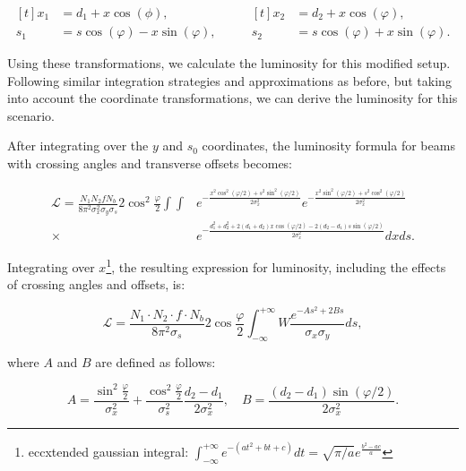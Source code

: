 \begin{equation}
\begin{aligned}[t]
x_1 &= d_1 + x \cos(\phi),  \\
s_1 &= s \cos(\varphi) - x \sin(\varphi),
\end{aligned}
\qquad
\begin{aligned}[t]
       x_2 &= d_2 + x \cos(\varphi), \\
        s_2 &= s \cos(\varphi) + x \sin(\varphi).
\end{aligned}
\end{equation}

Using these transformations, we calculate the luminosity for this modified setup. Following similar integration strategies and approximations as before, but taking into account the coordinate transformations, we can derive the luminosity for this scenario.

After integrating over the \(y\) and \(s_0\) coordinates, the luminosity formula for beams with crossing angles and transverse offsets becomes:

\begin{align}
\mathcal{L} = \frac{N_1 N_2  f  N_b}{8 \pi^2  \sigma_x^2 \sigma_y  \sigma_s} 2 \cos^2\frac{\varphi} {2}\int\int &e^{-\frac{x^2 \cos^2(\varphi/2) + s^2 \sin^2(\varphi/2)}{2 \sigma_x^2}}e^{-\frac{x^2 \sin^2(\varphi/2) + s^2 \cos^2(\varphi/2)}{2 \sigma_x^2}}\\
\times & e^{-\frac{d_1^2+d_2^2+2(d_1+d_2)x\cos(\varphi/2)-2(d_2-d_1)s\sin(\varphi/2)}{2\sigma_x^2}}dxds.
\end{align}

Integrating over \(x\)\footnote{eccxtended gaussian integral: $\int_{-\infty}^{+\infty}e^{-(at^2+bt+c)}dt = \sqrt{\pi/a}e^{\frac{b^2-ac}{a}}$}, the resulting expression for luminosity, including the effects of crossing angles and offsets, is:

\begin{equation}
\mathcal{L} = \frac{N_1 \cdot N_2 \cdot f \cdot N_b}{8 \pi^2 \sigma_s} 2\cos\frac{\varphi}{2} \int_{-\infty}^{+\infty}W \frac{e^{-As^2 + 2Bs}}{\sigma_x\sigma_y}ds,
\end{equation}

where \(A\) and \(B\) are defined as follows:

\begin{equation}
A = \frac{\sin^2\frac{\varphi}{2}}{\sigma_x^2} + \frac{\cos^2\frac{\varphi}{2}}{\sigma_s^2} \frac{d_2 - d_1}{2 \sigma_x^2}, \quad
B = \frac{(d_2 - d_1)\sin(\varphi/2)}{2 \sigma_x^2}.
\end{equation}

